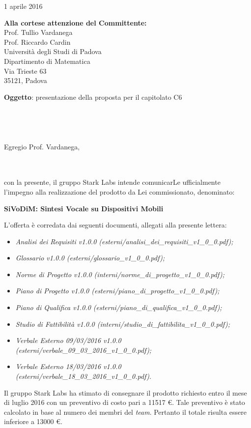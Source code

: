 \documentclass[11pt,a4paper]{letter} %
\def\opening#1{\thispagestyle{empty}
{\centering\fromaddress \vspace{0.6in} \\ %
\hspace*{\longindentation}\hspace*{\fill}\par} %
{\raggedright \toname \\ \toaddress \par} %
\vspace{0.4in} %
\noindent #1 %
}
\begin{document}

\begin{letter}
{
\hspace{15cm}1 aprile 2016

\textbf{Alla cortese attenzione del Committente:}\\
Prof. Tullio Vardanega\\
Prof. Riccardo Cardin\\
Università degli Studi di Padova\\
Dipartimento di Matematica\\
Via Trieste 63\\
35121, Padova

\vspace{1cm}
\textbf{Oggetto}: presentazione della proposta per il capitolato C6
}



\opening{Egregio Prof. Vardanega,}
\\
\\
 con la presente, il gruppo Stark Labs intende comunicarLe ufficialmente l’impegno alla realizzazione del prodotto da Lei commissionato, denominato:
\begin{center}
\textbf{SiVoDiM: Sintesi Vocale su Dispositivi Mobili}\\
\end{center}
L’offerta è corredata dai seguenti documenti, allegati alla presente lettera:

\begin{itemize}
	\item{\textit{Analisi dei Requisiti v1.0.0 (esterni/analisi\_dei\_requisiti\_v1\_0\_0.pdf);}}
	\item{\textit{Glossario v1.0.0 (esterni/glossario\_v1\_0\_0.pdf);}}
	\item{\textit{Norme di Progetto v1.0.0 (interni/norme\_di\_progetto\_v1\_0\_0.pdf);}}		
	\item{\textit{Piano di Progetto v1.0.0 (esterni/piano\_di\_progetto\_v1\_0\_0.pdf);}}
	\item{\textit{Piano di Qualifica v1.0.0 (esterni/piano\_di\_qualifica\_v1\_0\_0.pdf);}}
	\item{\textit{Studio di Fattibilità v1.0.0 (interni/studio\_di\_fattibilita\_v1\_0\_0.pdf);}}			
	\item{\textit{Verbale Esterno 09/03/2016 v1.0.0 (esterni/verbale\_09\_03\_2016\_v1\_0\_0.pdf);}}
	\item{\textit{Verbale Esterno 18/03/2016 v1.0.0 (esterni/verbale\_18\_03\_2016\_v1\_0\_0.pdf).}}
\end{itemize}
Il gruppo Stark Labs ha stimato di consegnare il prodotto richiesto entro il 
mese di luglio 2016 con un preventivo di costo pari a 11517 €. Tale preventivo è stato calcolato in base al numero dei membri del \textit{team}. Pertanto il totale risulta essere inferiore a 13000 €. 


\end{letter}
\end{document}

